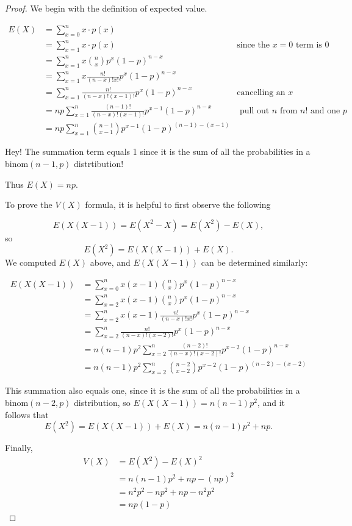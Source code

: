 \documentclass[
]{book}
\theoremstyle{definition}
\theoremstyle{definition}
\theoremstyle{definition}
\theoremstyle{definition}
\theoremstyle{remark}
\begin{document}
\begin{proof}
We begin with the definition of expected value.

\begin{align*}
E(X) &= \sum_{x=0}^n x \cdot p(x) \\
     &= \sum_{x=1}^n x \cdot p(x) & \text{since the } x = 0 \text{ term is  } 0 \\
     &= \sum_{x=1}^n x \binom{n}{x} p^x (1-p)^{n-x} \\
     &= \sum_{x=1}^n x \frac{n!}{(n-x)!x!} p^x (1-p)^{n-x} \\
     &= \sum_{x=1}^n \frac{n!}{(n-x)!(x-1)!} p^x (1-p)^{n-x} &\text{cancelling an } x\\
     &= np \sum_{x=1}^n \frac{(n-1)!}{(n-x)!(x-1)!}p^{x-1}(1-p)^{n-x} &\text{ pull out }n\text{ from }n!\text{ and one }p\\
     &= np \sum_{x=1}^n \binom{n-1}{x-1}p^{x-1}(1-p)^{(n-1)-(x-1)}
\end{align*}

Hey! The summation term equals 1 since it is the sum of all the probabilities in a binom\((n-1,p)\) distrtibution!

Thus \(E(X) = np\).

To prove the \(V(X)\) formula, it is helpful to first observe the following

\[E(X(X-1)) = E(X^2-X) = E(X^2)-E(X),\] so
\[E(X^2) = E(X(X-1))+E(X).\]
We computed \(E(X)\) above, and \(E(X(X-1))\) can be determined similarly:

\begin{align*}
E(X(X-1)) &= \sum_{x=0}^n x(x-1)\binom{n}{x}p^x(1-p)^{n-x} \\
          &= \sum_{x=2}^n x(x-1)\binom{n}{x}p^x(1-p)^{n-x} \\
          &= \sum_{x=2}^n x(x-1)\frac{n!}{(n-x)!x!}p^x(1-p)^{n-x} \\
          &= \sum_{x=2}^n \frac{n!}{(n-x)!(x-2)!}p^x(1-p)^{n-x} \\
          &= n(n-1)p^2 \sum_{x=2}^n \frac{(n-2)!}{(n-x)!(x-2)!}p^{x-2}(1-p)^{n-x} \\
          &= n(n-1)p^2 \sum_{x=2}^n\binom{n-2}{x-2}p^{x-2}(1-p)^{(n-2)-(x-2)}
\end{align*}

This summation also equals one, since it is the sum of all the probabilities in a binom\((n-2,p)\) distribution, so \(E(X(X-1)) = n(n-1)p^2\), and it follows that
\[E(X^2) = E(X(X-1))+E(X) = n(n-1)p^2 + np.\]

Finally,
\begin{align*} 
V(X) &= E(X^2) - E(X)^2 \\
     &= n(n-1)p^2 + np - (np)^2 \\
     &= n^2p^2 - np^2 + np - n^2p^2 \\
     &= np(1-p)
\end{align*}
\end{proof}
\end{document}
